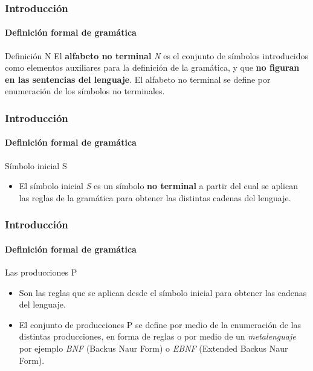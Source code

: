 \documentclass{beamer}
\begin{document}
        \begin{frame}
            \frametitle{Introducci\'on}
            \framesubtitle{Definici\'on formal de gram\'atica}

			\begin{block}{Definici\'on N}
                El \textbf{alfabeto no terminal} \emph{N} es el conjunto de s\'imbolos introducidos como elementos auxiliares para la definici\'on de la gram\'atica, y que \textbf{no figuran en las sentencias del lenguaje}. El alfabeto no terminal se define por enumeraci\'on de los s\'imbolos no terminales.
			\end{block}
		\end{frame}

        \begin{frame}
            \frametitle{Introducci\'on}
            \framesubtitle{Definici\'on formal de gram\'atica}

            \begin{block}{S\'imbolo inicial S}
                \begin{itemize}
                    \item[\checkmark] El s\'imbolo inicial \emph{S} es un s\'imbolo \textbf{no terminal} a partir del cual se aplican las reglas de la gram\'atica para obtener las distintas cadenas del lenguaje.
                \end{itemize}
			\end{block}
		\end{frame}

        \begin{frame}
            \frametitle{Introducci\'on}
            \framesubtitle{Definici\'on formal de gram\'atica}

            \begin{block}{Las producciones P}
                \begin{itemize}
                    \item[\checkmark] Son las reglas que se aplican desde el s\'imbolo inicial para obtener las cadenas del lenguaje. 
                    \item[\checkmark] El conjunto de producciones P se define por medio de la enumeraci\'on de las distintas producciones, en forma de reglas o por medio de un \emph{metalenguaje} por ejemplo \emph{BNF} (Backus Naur Form) o \emph{EBNF} (Extended Backus Naur Form).
                \end{itemize}
			\end{block}
		\end{frame}
\end{document}

